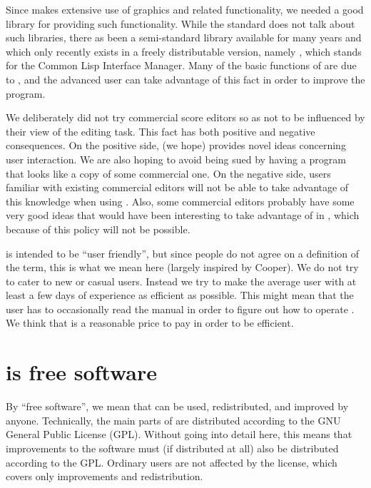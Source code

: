 Since \sysname{} makes extensive use of graphics and related functionality,
we needed a good library for providing such functionality.  While the
{\commonlisp} standard does not talk about such libraries, there as been a
semi-standard library available for many years and which only recently
exists in a freely distributable version, namely {\clim}\index{\clim},
which stands for the Common Lisp Interface Manager.  Many of the basic
functions of \sysname{} are due to {\clim}, and the advanced \sysname{} user can
take advantage of this fact in order to improve the program. 

We deliberately did not try commercial score editors so as not to be
influenced by their view of the editing task.  This fact has both
positive and negative consequences.  On the positive side, \sysname{} (we
hope) provides novel ideas concerning user interaction.  We are also
hoping to avoid being sued by having a program that looks like a copy
of some commercial one.  On the negative side, users familiar with
existing commercial editors will not be able to take advantage of this
knowledge when using \sysname{}.  Also, some commercial editors probably
have some very good ideas that would have been interesting to take
advantage of in \sysname{}, which because of this policy will not be
possible. 

\sysname{} is intended to be ``user friendly'', but since people do not
agree on a definition of the term, this is what we mean here (largely
inspired by Cooper).  We do not try to cater to new or casual users.
Instead we try to make the average user with at least a few days of
experience as efficient as possible.  This might mean that the user
has to occasionally read the manual in order to figure out how to
operate \sysname{}.  We think that is a reasonable price to pay in order to
be efficient. 
\section{\sysname{} is free software}

By ``free software'', we mean that \sysname{} can be used, redistributed,
and improved by anyone.  Technically, the main parts of \sysname{} are
distributed according to the GNU General Public License (GPL).
Without going into detail here, this means that improvements to the
software must (if distributed at all) also be distributed according to
the GPL.  Ordinary users are not affected by the license, which covers
only improvements and redistribution.  

